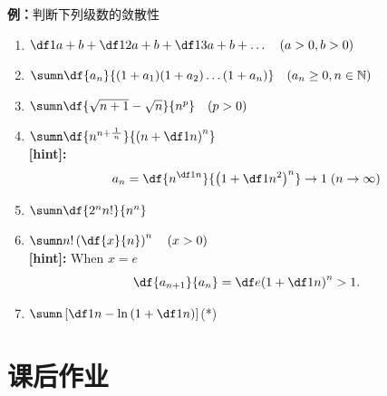 {\bf 例：}判断下列级数的敛散性
\begin{enumerate}[(1)]
  \setlength{\itemindent}{1cm}
  
  \item $\df 1{a+b}+\df 1{2a+b}+\df 1{3a+b}+\ldots\quad (a>0,b>0)$
  \item $\sumn\df {a_n}{(1+a_1)(1+a_2)\ldots(1+a_n)}\quad(a_n\geq
	  0,n\in\mathbb{N})$
  
  \item $\sumn\df{\sqrt{n+1}-\sqrt{n}}{n^p}\quad(p>0)$
  \item $\sumn\df{n^{n+\frac 1{\,n\,}}}{\left(n+\df 1n\right)^n}$\\
  {\bf [hint]:}
  $$a_n=\df{n^{\df1n}}{\left(1+\df1{n^2}\right)^n}\to1\;(n\to\infty)$$
  \item $\sumn\df{2^nn!}{n^n}$
  \item $\sumn n!\left(\df{x}{n}\right)^n\quad (x>0)$\\
  {\bf [hint]:} When $x=e$
  $$\df{a_{n+1}}{a_n}=\df e{\left(1+\df1n\right)^n}>1.$$
  \item $\sumn\left[\df 1n-\ln\left(1+\df 1n\right)\right]$(*)
\end{enumerate}

\newpage

\section*{课后作业}

